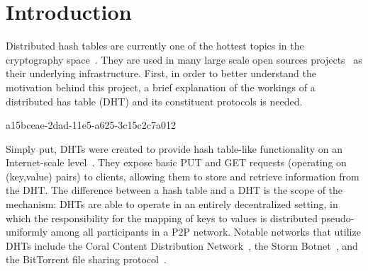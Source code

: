 \documentclass[12pt]{article}
\begin{document}
\section{Introduction}
\par Distributed hash tables are currently one of the hottest topics in the cryptography space~\cite{Stoica:2001dj,Rowstron:2001ea,Ratnasamy:2001wn}. They are used in many large scale open sources projects~\cite{Freitas:2013tb,Xu:2010vs,Perfitt:2010fh} as their underlying infrastructure. First, in order to better understand the motivation behind this project, a brief explanation of the workings of a distributed has table (DHT) and its constituent protocols is needed.

a15bceae-2dad-11e5-a625-3c15c2c7a012\par Simply put, DHTs were created to provide hash table-like functionality on an Internet-scale level~\cite{Ratnasamy:2001wn}. They expose basic PUT and GET requests (operating on (key,value) pairs) to clients, allowing them to store and retrieve information from the DHT. The difference between a hash table and a DHT is the scope of the mechanism: DHTs are able to operate in an entirely decentralized setting, in which the responsibility for the mapping of keys to values is distributed pseudo-uniformly among all participants in a P2P network. Notable networks that utilize DHTs include the Coral Content Distribution Network~\cite{Freedman:2004vb}, the Storm Botnet~\cite{Holz:2008uk}, and the BitTorrent file sharing protocol~\cite{Cohen:y1_8mBnw}.
\end{document}
